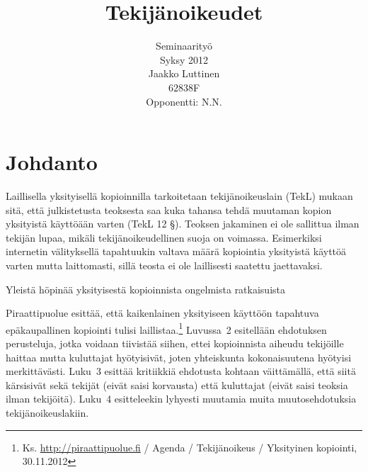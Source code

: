 \documentclass[titlepage,12pt]{article}
\title{Tekijänoikeudet}
\author{
  Seminaarityö\\
  \hfill Syksy 2012\\
  Jaakko Luttinen\\
  $62838$F\\
  Opponentti: N.N.
}
\date{ }
\begin{document}
\renewcommand\refname{Lähteet}
\renewcommand\bibname{Lähteet}

\nocite{*}

\maketitle

\tableofcontents



\pagebreak


\section{Johdanto}


Laillisella yksityisellä kopioinnilla tarkoitetaan tekijänoikeuslain
(TekL) mukaan sitä, että julkistetusta teoksesta saa kuka tahansa
tehdä muutaman kopion yksityistä käyttöään varten (TekL 12 §). Teoksen
jakaminen ei ole sallittua ilman tekijän lupaa, mikäli
tekijänoikeudellinen suoja on voimassa.  Esimerkiksi internetin
välityksellä tapahtuukin valtava määrä kopiointia yksityistä käyttöä
varten mutta laittomasti, sillä teosta ei ole laillisesti saatettu
jaettavaksi.

Yleistä höpinää yksityisestä kopioinnista ongelmista ratkaisuista



Piraattipuolue esittää, että kaikenlainen yksityiseen käyttöön
tapahtuva epäkaupallinen kopiointi tulisi
laillistaa.\footnote{Ks. \url{http://piraattipuolue.fi} / Agenda /
  Tekijänoikeus / Yksityinen kopiointi, 30.11.2012} Luvussa~2
esitellään ehdotuksen perusteluja, jotka voidaan tiivistää siihen,
ettei kopioinnista aiheudu tekijöille haittaa mutta kuluttajat
hyötyisivät, joten yhteiskunta kokonaisuutena hyötyisi merkittävästi.
Luku~3 esittää kritiikkiä ehdotusta kohtaan väittämällä, että siitä
kärsisivät sekä tekijät (eivät saisi korvausta) että kuluttajat (eivät
saisi teoksia ilman tekijöitä).  Luku~4 esitteleekin lyhyesti muutamia
muita muutosehdotuksia tekijänoikeuslakiin.

\end{document}
